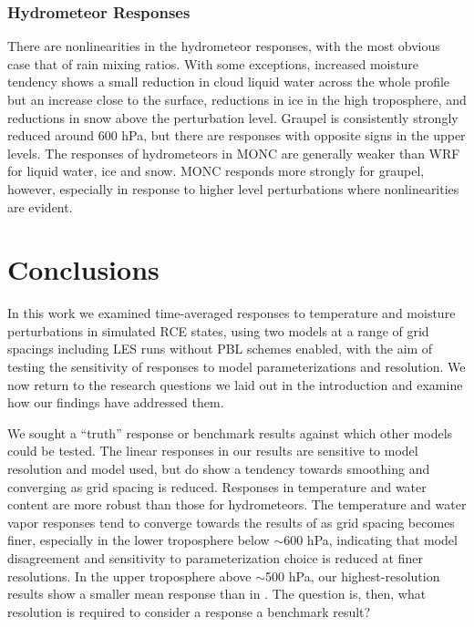 \documentclass[draft]{agujournal2019}
\begin{document}
\subsubsection{Hydrometeor Responses}

There are nonlinearities in the hydrometeor responses, with the most obvious
case that of rain mixing ratios. With some exceptions, increased moisture
tendency shows a small reduction in cloud liquid water across the whole profile
but an increase close to the surface, reductions in ice in the high troposphere,
and reductions in snow above the perturbation level. Graupel is consistently
strongly reduced around 600 hPa, but there are responses with opposite signs in
the upper levels. The responses of hydrometeors in MONC are generally weaker
than WRF for liquid water, ice and snow. MONC responds more strongly for
graupel, however, especially in response to higher level perturbations where
nonlinearities are evident.

\section{Conclusions}
\label{sec:conclusions}

In this work we examined time-averaged responses to temperature and moisture
perturbations in simulated RCE states, using two models at a range of grid
spacings including LES runs without PBL schemes enabled, with the aim of testing
the sensitivity of responses to model parameterizations and resolution. We now
return to the research questions we laid out in the introduction and examine how
our findings have addressed them.

We sought a ``truth'' response or benchmark results against which other models
could be tested. The linear responses in our results are sensitive to model
resolution and model used, but do show a tendency towards smoothing and
converging as grid spacing is reduced. Responses in temperature and water
content are more robust than those for hydrometeors. The temperature and water
vapor responses tend to converge towards the results of 
as grid spacing becomes finer, especially in the lower troposphere below
$\sim$600 hPa, indicating that model disagreement and sensitivity to
parameterization choice is reduced at finer resolutions. In the upper
troposphere above $\sim$500 hPa, our highest-resolution results show a smaller
mean response than in . The question is, then, what
resolution is required to consider a response a benchmark result?
\end{document}
